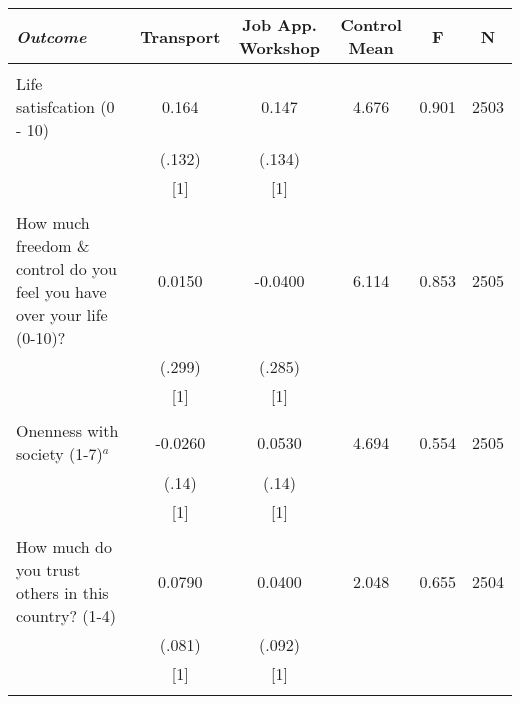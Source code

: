 \begin{tabular}{lccccc} \hline
\multicolumn{1}{l}{\emph{Outcome}} & \multicolumn{1}{c}{Transport} &\multicolumn{1}{c}{Job App. Workshop} & \multicolumn{1}{c}{Control Mean} & \multicolumn{1}{c}{F} & \multicolumn{1}{c}{N} \\ \hline \\
Life satisfcation (0 - 10) & 0.164 & 0.147 & 4.676 & 0.901 & 2503 \\
& (.132) & (.134) &  &  &  \\
& [1] & [1] &  &  &  \\
&  &  &  &  &  \\
How much freedom \& control do you feel you have over your life (0-10)? & 0.0150 & -0.0400 & 6.114 & 0.853 & 2505 \\
& (.299) & (.285) &  &  &  \\
& [1] & [1] &  &  &  \\
&  &  &  &  &  \\
Onenness with society (1-7)$^{a}$ & -0.0260 & 0.0530 & 4.694 & 0.554 & 2505 \\
& (.14) & (.14) &  &  &  \\
& [1] & [1] &  &  &  \\
&  &  &  &  &  \\
How much do you trust others in this country? (1-4) & 0.0790 & 0.0400 & 2.048 & 0.655 & 2504 \\
& (.081) & (.092) &  &  &  \\
& [1] & [1] &  &  &  \\
&  &  &  &  &  \\ \hline
\end{tabular}
